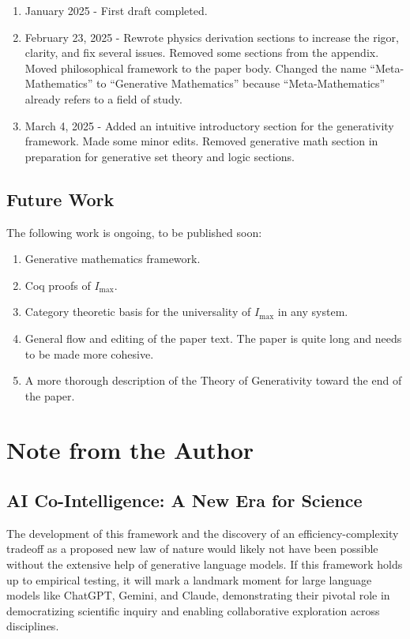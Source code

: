 \documentclass[12pt]{article}
\begin{document}
\begin{enumerate}
    \item January 2025 - First draft completed.
    \item February 23, 2025 - Rewrote physics derivation sections to increase the rigor, clarity, and fix several issues. Removed some sections from the appendix. Moved philosophical framework to the paper body. Changed the name ``Meta-Mathematics'' to ``Generative Mathematics'' because ``Meta-Mathematics'' already refers to a field of study.
    \item March 4, 2025 - Added an intuitive introductory section for the generativity framework. Made some minor edits. Removed generative math section in preparation for generative set theory and logic sections.
\end{enumerate}

\subsection{Future Work}
The following work is ongoing, to be published soon:
\begin{enumerate}
    \item Generative mathematics framework.
    \item Coq proofs of $I_\text{max}$.
    \item Category theoretic basis for the universality of $I_\text{max}$ in any system.
    \item General flow and editing of the paper text. The paper is quite long and needs to be made more cohesive.
    \item A more thorough description of the Theory of Generativity toward the end of the paper.
\end{enumerate}

\section*{Note from the Author}

\subsection*{AI Co-Intelligence: A New Era for Science}

The development of this framework and the discovery of an efficiency-complexity tradeoff as a proposed new law of nature would likely not have been possible without the extensive help of generative language models. If this framework holds up to empirical testing, it will mark a landmark moment for large language models like ChatGPT, Gemini, and Claude, demonstrating their pivotal role in democratizing scientific inquiry and enabling collaborative exploration across disciplines.
\end{document}
